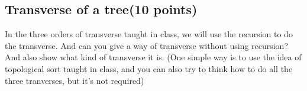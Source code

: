 \documentclass[11pt]{exam}
\begin{document}
    \newpage
    \subsection{Transverse of a tree(10 points)}
    In the three orders of transverse taught in class, we will use the recursion to do the transverse. And can you give a way of transverse without using recursion? And also show what kind of transverse it is. (One simple way is to use the idea of topological sort taught in class, and you can also try to think how to do all the three tranverses, but it's not required)\par \par 
    \begin{solution}
    \\ \hspace*{\fill} \\
    \\ \hspace*{\fill} \\
    \\ \hspace*{\fill} \\
    \\ \hspace*{\fill} \\
    \\ \hspace*{\fill} \\
    \\ \hspace*{\fill} \\
    \\ \hspace*{\fill} \\
    \\ \hspace*{\fill} \\
    \\ \hspace*{\fill} \\
    \\ \hspace*{\fill} \\
    \\ \hspace*{\fill} \\
    \\ \hspace*{\fill} \\
    \\ \hspace*{\fill} \\

\end{solution}
\end{document}
